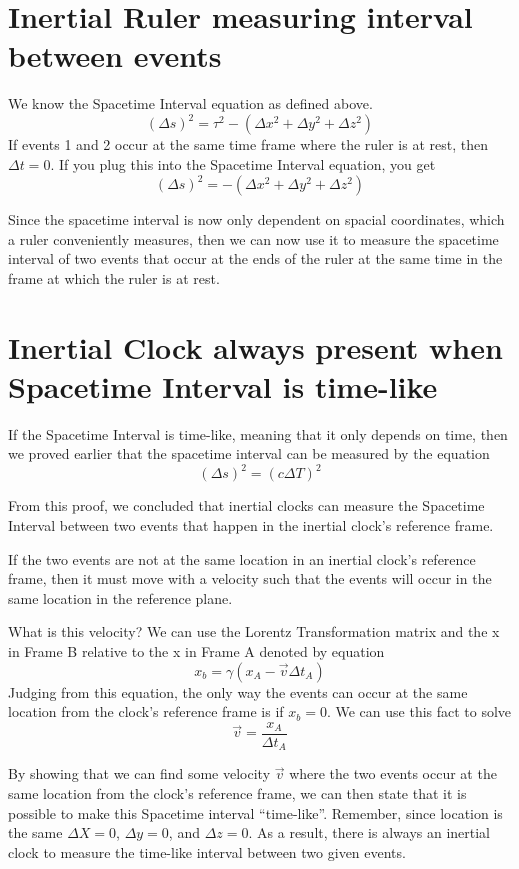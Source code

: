 \documentclass{article}
\begin{document}
\section{Inertial Ruler measuring interval between events}
We know the Spacetime Interval equation as defined above.
\[
  (\Delta s)^2 = \tau^2 - (\Delta x^2 + \Delta y^2 + \Delta z^2)
\]
If events 1 and 2 occur at the same time frame where the ruler is at rest, then \(\Delta t = 0\). If you plug this into the Spacetime Interval equation, you get
\[
  (\Delta s)^2 = -(\Delta x^2 + \Delta y^2 + \Delta z^2)
\]

Since the spacetime interval is now only dependent on spacial coordinates, which a ruler conveniently measures, then we can now use it to measure the spacetime interval of two events that occur at the ends of the ruler at the same time in the frame at which the ruler is at rest.

\newpage
\section{Inertial Clock always present when Spacetime Interval is time-like}
If the Spacetime Interval is time-like, meaning that it only depends on time, then we proved earlier that the spacetime interval can be measured by the equation
\[
  (\Delta s)^2 = (c\Delta T)^2
\]

From this proof, we concluded that inertial clocks can measure the Spacetime Interval between two events that happen in the inertial clock's reference frame.

If the two events are not at the same location in an inertial clock's reference frame, then it must move with a velocity such that the events will occur in the same location in the reference plane.

What is this velocity? We can use the Lorentz Transformation matrix and the x in Frame B relative to the x in Frame A denoted by equation
\[
  x_b = \gamma (x_A - \vec{v} \Delta t_A)
\]
Judging from this equation, the only way the events can occur at the same location from the clock's reference frame is if \(x_b = 0\). We can use this fact to solve
\[
  \vec{v} = \frac{x_A}{\Delta t_A}
\]

By showing that we can find some velocity \(\vec{v}\) where the two events occur at the same location from the clock's reference frame, we can then state that it is possible to make this Spacetime interval ``time-like''. Remember, since location is the same \(\Delta X = 0\), \(\Delta y = 0\), and \(\Delta z = 0\). As a result, there is always an inertial clock to measure the time-like interval between two given events.
\newpage
\end{document}
